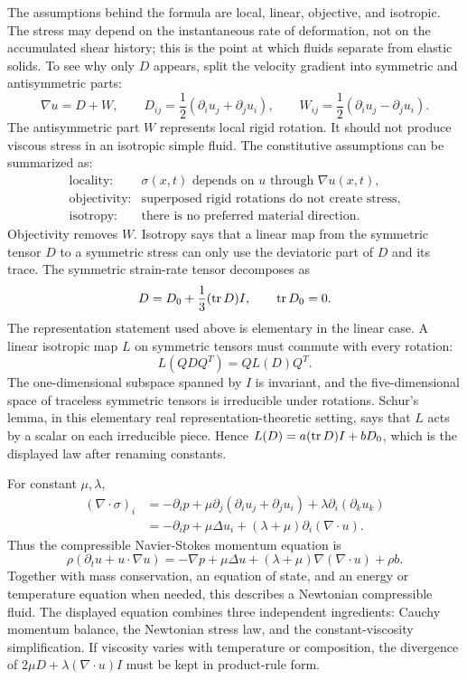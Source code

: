 The assumptions behind the formula are local, linear, objective, and isotropic.
The stress may depend on the instantaneous rate of deformation, not on the
accumulated shear history; this is the point at which fluids separate from
elastic solids. To see why only \(D\) appears, split the velocity gradient into
symmetric and antisymmetric parts:
\[
  \nabla u=D+W,
  \qquad
  D_{ij}=\frac12(\partial_i u_j+\partial_j u_i),
  \qquad
  W_{ij}=\frac12(\partial_i u_j-\partial_j u_i).
\]
The antisymmetric part \(W\) represents local rigid rotation. It should not
produce viscous stress in an isotropic simple fluid. The constitutive
assumptions can be summarized as:
\[
\begin{array}{ll}
\text{locality:} & \sigma(x,t) \text{ depends on } u \text{ through }
  \nabla u(x,t),\\
\text{objectivity:} & \text{superposed rigid rotations do not create stress},\\
\text{isotropy:} & \text{there is no preferred material direction}.
\end{array}
\]
Objectivity removes \(W\). Isotropy says that a linear map from the symmetric
tensor \(D\) to a symmetric stress can only use the deviatoric part of \(D\)
and its trace. The symmetric strain-rate tensor decomposes as
\[
  D=D_0+\frac13(\operatorname{tr} D)I,\qquad \operatorname{tr} D_0=0.
\]
The representation statement used above is elementary in the linear case. A
linear isotropic map \(L\) on symmetric tensors must commute with every
rotation:
\[
  L(QDQ^T)=QL(D)Q^T.
\]
The one-dimensional subspace spanned by \(I\) is invariant, and the
five-dimensional space of traceless symmetric tensors is irreducible under
rotations. Schur's lemma, in this elementary real representation-theoretic
setting, says that \(L\) acts by a scalar on each irreducible piece. Hence
\(L(D)=a(\operatorname{tr} D)I+bD_0\), which is the displayed law after renaming constants.

For constant \(\mu,\lambda\),
\[
\begin{aligned}
  (\nabla\cdot\sigma)_i
  &=
  -\partial_i p
  +
  \mu\partial_j(\partial_i u_j+\partial_j u_i)
  +
  \lambda\partial_i(\partial_k u_k)\\
  &=
  -\partial_i p
  +
  \mu\Delta u_i
  +
  (\lambda+\mu)\partial_i(\nabla\cdot u).
\end{aligned}
\]
Thus the compressible Navier-Stokes momentum equation is
\[
  \boxed{
  \rho
  \left(
    \partial_tu+u\cdot\nabla u
  \right)
  =
  -\nabla p+\mu\Delta u+(\lambda+\mu)\nabla(\nabla\cdot u)+\rho b.
  }
\]
Together with mass conservation, an equation of state, and an energy or
temperature equation when needed, this describes a Newtonian compressible fluid.
The displayed equation combines three independent ingredients: Cauchy momentum
balance, the Newtonian stress law, and the constant-viscosity simplification. If
viscosity varies with temperature or composition, the divergence of
\(2\mu D+\lambda(\nabla\cdot u)I\) must be kept in product-rule form.

